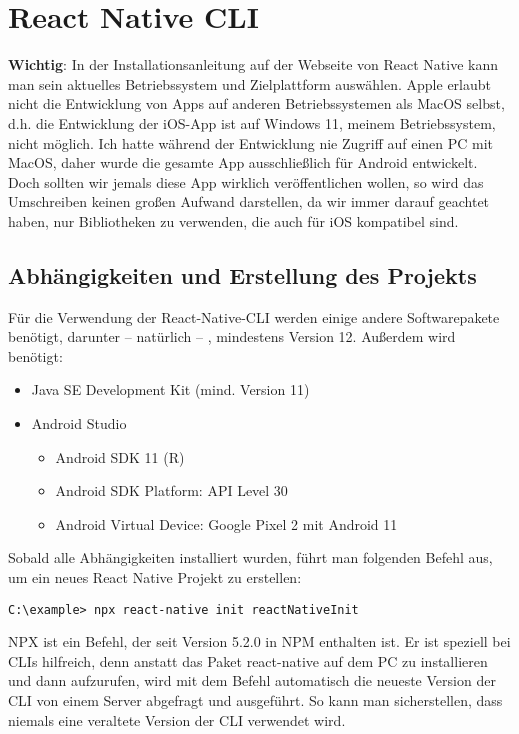 \section{React Native CLI}
\textbf{Wichtig}: In der Installationsanleitung auf der Webseite von React Native kann man sein
aktuelles Betriebssystem und Zielplattform auswählen. Apple erlaubt nicht die Entwicklung von Apps
auf anderen Betriebssystemen als MacOS selbst, d.h. die Entwicklung der iOS-App ist auf Windows 11,
meinem Betriebssystem, nicht möglich. Ich hatte während der Entwicklung nie Zugriff auf einen PC mit
MacOS, daher wurde die gesamte App ausschließlich für Android entwickelt. Doch sollten wir jemals
diese App wirklich veröffentlichen wollen, so wird das Umschreiben keinen großen Aufwand darstellen,
da wir immer darauf geachtet haben, nur Bibliotheken zu verwenden, die auch für iOS kompatibel sind.

\subsection{Abhängigkeiten und Erstellung des Projekts}
Für die Verwendung der React-Native-CLI werden einige andere Softwarepakete benötigt, darunter --
natürlich -- , mindestens Version 12. Außerdem wird benötigt:

\begin{itemize}
  \item Java SE Development Kit (mind. Version 11)
  \item Android Studio
  \begin{itemize}
    \item Android SDK 11 (R)
    \item Android SDK Platform: API Level 30
    \item Android Virtual Device: Google Pixel 2 mit Android 11
  \end{itemize}
\end{itemize}

Sobald alle Abhängigkeiten installiert wurden, führt man folgenden Befehl aus, um ein neues React
Native Projekt zu erstellen:

\begin{lstlisting}
C:\example> npx react-native init reactNativeInit
\end{lstlisting}

NPX ist ein Befehl, der seit Version 5.2.0 in NPM enthalten ist. Er ist speziell bei CLIs hilfreich,
denn anstatt das Paket react-native auf dem PC zu installieren und dann aufzurufen, wird mit dem
Befehl automatisch die neueste Version der CLI von einem Server abgefragt und ausgeführt. So kann
man sicherstellen, dass niemals eine veraltete Version der CLI verwendet wird.

